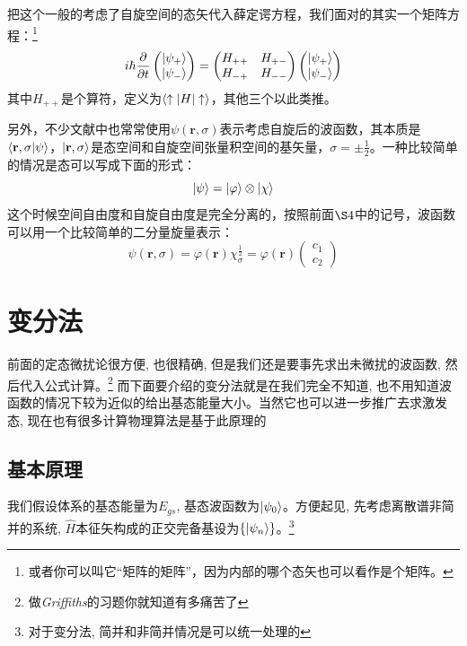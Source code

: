 \documentclass[a4paper,zihao=-4,linespread=1]{ctexrep}
\begin{document}
	把这个一般的考虑了自旋空间的态矢代入薛定谔方程，我们面对的其实一个矩阵方程：\footnote{或者你可以叫它“矩阵的矩阵”，因为内部的哪个态矢也可以看作是个矩阵。}
	\begin{equation}
		i\hbar\frac{\partial}{\partial {t}}\begin{pmatrix}
			\ket{\psi_+}\\ \ket{\psi_-}
		\end{pmatrix}=\begin{pmatrix}
			H_{++}&H_{+-}\\H_{-+}&H_{--}
		\end{pmatrix}\begin{pmatrix}
	\ket{\psi_+}\\ \ket{\psi_-}
	\end{pmatrix}
	\end{equation}
	其中$H_{++}$是个算符，定义为$\braket{\uparrow|H|\uparrow}$，其他三个以此类推。
	
	另外，不少文献中也常常使用$\psi(\mathbf{r},\sigma)$表示考虑自旋后的波函数，其本质是$\braket{\mathbf{r},\sigma|\psi}$，$\ket{\mathbf{r},\sigma}$是态空间和自旋空间张量积空间的基矢量，$\sigma=\pm\frac{1}{2}$。一种比较简单的情况是态可以写成下面的形式：
	\[\ket{\psi}=\ket{\varphi}\otimes\ket{\chi}\]
	这个时候空间自由度和自旋自由度是完全分离的，按照前面$\S 4$中的记号，波函数可以用一个比较简单的二分量旋量表示：
	\[\psi(\mathbf{r},\sigma)=\varphi(\mathbf{r})\chi_\sigma^\frac{1}{2}=\varphi(\mathbf{r})\begin{pmatrix}
		c_1\\
		c_2
	\end{pmatrix}\]
	
    \chapter{变分法}
    前面的定态微扰论很方便, 也很精确, 但是我们还是要事先求出未微扰的波函数, 然后代入公式计算。\footnote{做{\itshape Griffiths}的习题你就知道有多痛苦了}
    而下面要介绍的变分法就是在我们完全不知道, 也不用知道波函数的情况下较为近似的给出基态能量大小。当然它也可以进一步推广去求激发态, 现在也有很多计算物理算法是基于此原理的

    \section{基本原理}
    我们假设体系的基态能量为$E_{gs}$, 基态波函数为$\ket{\psi_{0}}$。方便起见, 先考虑离散谱非简并的系统, $\hat{H}$本征矢构成的正交完备基设为$\{\ket{\psi_n}\}$。\footnote{对于变分法, 简并和非简并情况是可以统一处理的}
\end{document}
